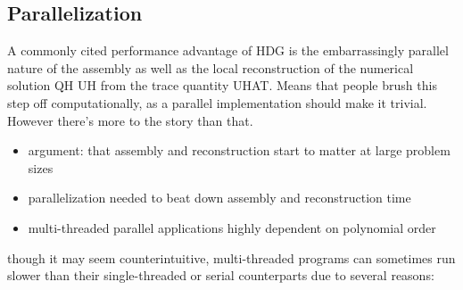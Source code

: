 \subsection{Parallelization}%
\label{sec:computational:parallelization}

A commonly cited performance advantage of HDG is the embarrassingly parallel nature of the assembly as well as the local reconstruction of the numerical solution QH UH from the trace quantity UHAT.
Means that people brush this step off computationally, as a parallel implementation should make it trivial.
However there's more to the story than that.

\begin{itemize}
  \item argument: that assembly and reconstruction start to matter at large problem sizes
  \item parallelization needed to beat down assembly and reconstruction time
  \item multi-threaded parallel applications highly dependent on polynomial order
\end{itemize}

though it may seem counterintuitive, multi-threaded programs can sometimes run slower than their single-threaded or serial counterparts due to several reasons:

